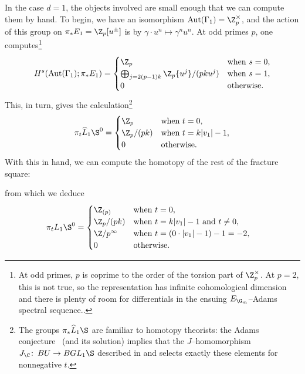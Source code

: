 \begin{example}\label{piLK1SExample}
In the case $d = 1$, the objects involved are small enough that we can compute them by hand.  To begin, we have an isomorphism $\operatorname{Aut}(\Gamma_1) = \Z_p^\times$, and the action of this group on $\pi_* E_1 = \Z_p[u^\pm]$ is by $\gamma \cdot u^n \mapsto \gamma^n u^n$.  At odd primes $p$, one computes\footnote{At odd primes, $p$ is coprime to the order of the torsion part of $\Z_p^\times$.  At $p = 2$, this is not true, so the representation has infinite cohomological dimension and there is plenty of room for differentials in the ensuing $E_{\G_m}$--Adams spectral sequence..} \[H^s(\operatorname{Aut}(\Gamma_1); \pi_* E_1) = \begin{cases}\Z_p & \text{when $s = 0$}, \\ \bigoplus_{j = 2(p-1)k} \Z_p\{u^j\} / (pk u^j) & \text{when $s = 1$}, \\ 0 & \text{otherwise}. \end{cases}\]  This, in turn, gives the calculation\footnote{The groups $\pi_* \widehat L_1 \S$ are familiar to homotopy theorists: the Adams conjecture~\cite{AdamsJXIV} (and its solution) implies that the $J$--homomorphism $J_{\C}\co BU \to BGL_1 \S$ described in  and  selects exactly these elements for nonnegative $t$.}
\[
\pi_t \widehat L_1 \S^0 = \begin{cases} \Z_p & \text{when $t = 0$}, \\ \Z_p / (pk) & \text{when $t = k|v_1| - 1$}, \\ 0 & \text{otherwise}. \end{cases}
\]
With this in hand, we can compute the homotopy of the rest of the fracture square:
\begin{center}
\end{center}
from which we deduce
\begin{align*}
\pi_t L_1 \S^0 & = \begin{cases} \Z_{(p)} & \text{when $t = 0$}, \\ \Z_p / (pk) & \text{when $t = k|v_1| - 1$ and $t \ne 0$}, \\ \Z/p^\infty & \text{when $t = (0 \cdot |v_1| - 1) - 1 = -2$}, \\ 0 & \text{otherwise}. \end{cases}
\end{align*}
\end{example}

